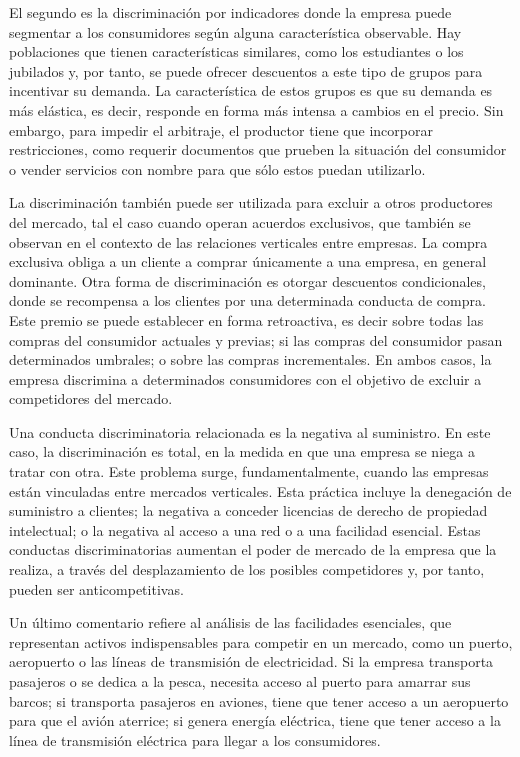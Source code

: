 \documentclass[
  12pt,
  spanish,
]{book}
\begin{document}
El segundo es la discriminación por indicadores donde la empresa puede
segmentar a los consumidores según alguna característica observable. Hay
poblaciones que tienen características similares, como los estudiantes o
los jubilados y, por tanto, se puede ofrecer descuentos a este tipo de
grupos para incentivar su demanda. La característica de estos grupos es
que su demanda es más elástica, es decir, responde en forma más intensa
a cambios en el precio. Sin embargo, para impedir el arbitraje, el
productor tiene que incorporar restricciones, como requerir documentos
que prueben la situación del consumidor o vender servicios con nombre
para que sólo estos puedan utilizarlo.

La discriminación también puede ser utilizada para excluir a otros
productores del mercado, tal el caso cuando operan acuerdos exclusivos,
que también se observan en el contexto de las relaciones verticales
entre empresas. La compra exclusiva obliga a un cliente a comprar
únicamente a una empresa, en general dominante. Otra forma de
discriminación es otorgar descuentos condicionales, donde se recompensa
a los clientes por una determinada conducta de compra. Este premio se
puede establecer en forma retroactiva, es decir sobre todas las compras
del consumidor actuales y previas; si las compras del consumidor pasan
determinados umbrales; o sobre las compras incrementales. En ambos
casos, la empresa discrimina a determinados consumidores con el objetivo
de excluir a competidores del mercado.

Una conducta discriminatoria relacionada es la negativa al suministro.
En este caso, la discriminación es total, en la medida en que una
empresa se niega a tratar con otra. Este problema surge,
fundamentalmente, cuando las empresas están vinculadas entre mercados
verticales. Esta práctica incluye la denegación de suministro a
clientes; la negativa a conceder licencias de derecho de propiedad
intelectual; o la negativa al acceso a una red o a una facilidad
esencial. Estas conductas discriminatorias aumentan el poder de mercado
de la empresa que la realiza, a través del desplazamiento de los
posibles competidores y, por tanto, pueden ser anticompetitivas.

Un último comentario refiere al análisis de las facilidades esenciales,
que representan activos indispensables para competir en un mercado, como
un puerto, aeropuerto o las líneas de transmisión de electricidad. Si la
empresa transporta pasajeros o se dedica a la pesca, necesita acceso al
puerto para amarrar sus barcos; si transporta pasajeros en aviones,
tiene que tener acceso a un aeropuerto para que el avión aterrice; si
genera energía eléctrica, tiene que tener acceso a la línea de
transmisión eléctrica para llegar a los consumidores.
\end{document}

